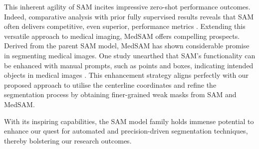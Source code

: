 This inherent agility of SAM incites impressive zero-shot performance outcomes. Indeed, comparative analysis with prior fully supervised results reveals that SAM often delivers competitive, even superior, performance metrics \cite{kirillov2023segany}. Extending this versatile approach to medical imaging, MedSAM \cite{MedSAM} offers compelling prospects. Derived from the parent SAM model, MedSAM has shown considerable promise in segmenting medical images. One study unearthed that SAM's functionality can be enhanced with manual prompts, such as points and boxes, indicating intended objects in medical images \cite{huang2023segment}. This enhancement strategy aligns perfectly with our proposed approach to utilise the centerline coordinates and refine the segmentation process by obtaining finer-grained weak masks from SAM and MedSAM.

With its inspiring capabilities, the SAM model family holds immense potential to enhance our quest for automated and precision-driven segmentation techniques, thereby bolstering our research outcomes.












